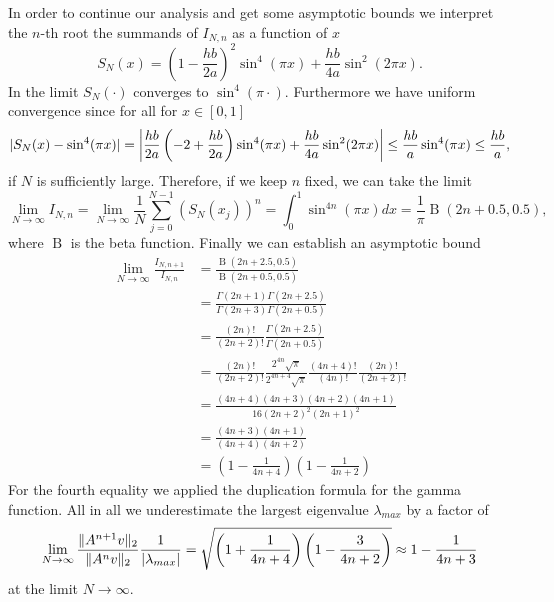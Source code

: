 \documentclass{scrartcl}
\begin{document}
	In order to continue our analysis and get some asymptotic bounds we interpret the $n$-th root the summands of $I_{N,n}$ as a function of $x$
	\[
	S_{N}(x) = \left(1-\frac{hb}{2a}\right)^{2} \sin^4\!\left(\pi x\right) + \frac{hb}{4a}\sin^2\!\left(2\pi x\right).
	\]
	In the limit $S_N(\cdot)$ converges to $\sin^4(\pi\cdot)$. Furthermore we have uniform convergence since for all for $x\in[0,1]$ 
	\begin{align*}
	\lvert S_N(x) - \sin^4(\pi x)\rvert =
	\left\lvert\frac{hb}{2a}\left(-2 + \frac{hb}{2a}\right) \sin^4\!\left(\pi x\right) + \frac{hb}{4a}\sin^2\!\left(2\pi x\right)\right\rvert \le \frac{hb}{a}\sin^4\!\left(\pi x\right) \le \frac{hb}{a}, 
	\end{align*}
	if $N$ is sufficiently large. Therefore, if we keep $n$ fixed, we can take the limit
	\[
	\lim_{N\to\infty} I_{N,n} = \lim_{N\to\infty} \frac{1}{N}\sum_{j=0}^{N-1}\left(S_N(x_j)\right)^n = \int_{0}^{1} \sin^{4n}(\pi x)dx = \frac{1}{\pi} \operatorname{B}(2n+0.5,0.5),
	\]
	\noindent where $\operatorname{B}$ is the beta function. Finally we can establish an asymptotic bound
	\begin{align*}
	\lim_{N\to\infty} \frac{I_{N,n+1}}{I_{N,n}} &=   
	\frac{\operatorname{B}(2n+2.5,0.5)}{\operatorname{B}(2n+0.5,0.5)} \\&= 
	\frac{\Gamma(2n + 1)\Gamma(2n + 2.5)}{\Gamma(2n + 3)\Gamma(2n + 0.5)} \\&= 
	\frac{(2n)!}{(2n+2)!}
	\frac{\Gamma(2n + 2.5)}{\Gamma(2n + 0.5)}\\&=
	\frac{(2n)!}{(2n+2)!}
	\frac{2^{4n}\sqrt\pi}{2^{4n+4}\sqrt\pi}
	\frac{(4n+4)!}{(4n)!}
	\frac{(2n)!}{(2n+2)!} \\&=
	\frac{(4n+4)(4n+3)(4n+2)(4n+1)}{16(2n+2)^2(2n+1)^2} \\&=
	\frac{(4n+3)(4n+1)}{(4n+4)(4n+2)}\\&=
	\left(1-\frac{1}{4n+4}\right)\left(1-\frac{1}{4n+2}\right)
	\end{align*}
	For the fourth equality we applied the duplication formula for the gamma function. All in all we underestimate the largest eigenvalue $\lambda_{max}$ by a factor of 
	\[
	\lim_{N\to\infty}\frac{\lVert A^{n+1}v\rVert_2}{\lVert A^{n}v\rVert_2}\frac{1}{\lvert\lambda_{max}\rvert} =
	\sqrt{\left(1+\frac{1}{4n+4}\right)\left(1-\frac{3}{4n+2}\right)} \approx 1-\frac{1}{4n+3}
	\]
	at the limit $N\to\infty$. %
\end{document}
